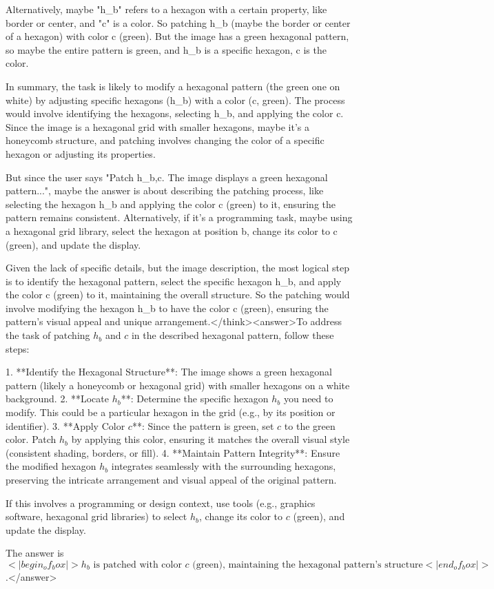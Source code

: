 Alternatively, maybe "h_b" refers to a hexagon with a certain property, like border or center, and "c" is a color. So patching h_b (maybe the border or center of a hexagon) with color c (green). But the image has a green hexagonal pattern, so maybe the entire pattern is green, and h_b is a specific hexagon, c is the color. 

In summary, the task is likely to modify a hexagonal pattern (the green one on white) by adjusting specific hexagons (h_b) with a color (c, green). The process would involve identifying the hexagons, selecting h_b, and applying the color c. Since the image is a hexagonal grid with smaller hexagons, maybe it's a honeycomb structure, and patching involves changing the color of a specific hexagon or adjusting its properties. 

But since the user says "Patch h_b,c. The image displays a green hexagonal pattern...", maybe the answer is about describing the patching process, like selecting the hexagon h_b and applying the color c (green) to it, ensuring the pattern remains consistent. Alternatively, if it's a programming task, maybe using a hexagonal grid library, select the hexagon at position b, change its color to c (green), and update the display. 

Given the lack of specific details, but the image description, the most logical step is to identify the hexagonal pattern, select the specific hexagon h_b, and apply the color c (green) to it, maintaining the overall structure. So the patching would involve modifying the hexagon h_b to have the color c (green), ensuring the pattern's visual appeal and unique arrangement.</think><answer>To address the task of patching \( h_b \) and \( c \) in the described hexagonal pattern, follow these steps:  

1. **Identify the Hexagonal Structure**: The image shows a green hexagonal pattern (likely a honeycomb or hexagonal grid) with smaller hexagons on a white background.  
2. **Locate \( h_b \)**: Determine the specific hexagon \( h_b \) you need to modify. This could be a particular hexagon in the grid (e.g., by its position or identifier).  
3. **Apply Color \( c \)**: Since the pattern is green, set \( c \) to the green color. Patch \( h_b \) by applying this color, ensuring it matches the overall visual style (consistent shading, borders, or fill).  
4. **Maintain Pattern Integrity**: Ensure the modified hexagon \( h_b \) integrates seamlessly with the surrounding hexagons, preserving the intricate arrangement and visual appeal of the original pattern.  

If this involves a programming or design context, use tools (e.g., graphics software, hexagonal grid libraries) to select \( h_b \), change its color to \( c \) (green), and update the display.  

The answer is \(<|begin_of_box|>h_b \text{ is patched with color } c \text{ (green), maintaining the hexagonal pattern’s structure}<|end_of_box|>\).</answer>